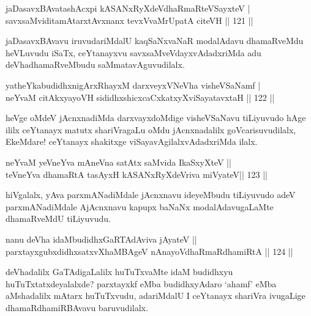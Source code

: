 \begin{shl}
jaDasavxBAvatashAcxpi kASANxRyXdeVdhaRmaRteVSayxteV | \\
savxsaMviditamAtarxtAvxnanx tevxVvaMrUpatA citeVH \hfill||  121 ||  
\end{shl}

\begin{artha}
jaDasavxBAvavu iruvudariMdalU kaqSaNxvaNaR modalAdavu dhamaRveMdu heVLuvudu iSaTx, ceYtanayxvu savxsaMveVdayxvAdadxriMda adu deVhadhamaRveMbudu saMmatavAguvudilalx.
\end{artha}

\begin{shl}
yatheYkabudidhxnigArxRhayxM darxveyxVNeVha visheVSaNamf | \\
neYvaM citAkxyayoVH sididhxshicxcaCxkatxyXviSayatavxtaH \hfill||  122 ||  
\end{shl}

\begin{artha}
heVge oMdeV jAcnxnadiMda darxvayxdoMdige visheVSaNavu tiLiyuvudo hAge ililx ceYtanayx matutx shariVragaLu oMdu jAcnxnadalilx goVcarisuvudilalx, EkeMdare! ceYtanayx shakitxge viSayavAgilalxvAdadxriMda ilalx.
\end{artha}


\begin{shl}
neYvaM yeVneYva mAneVna satAtx saMvida IkaSxyXteV ||  \\
teVneYva dhamaRtA tasAyxH kASANxRyXdeVriva miVyateV\hfill ||  123 ||  
\end{shl}

\begin{artha}
hiVgalalx, yAva parxmANadiMdale jAcnxnavu ideyeMbudu tiLiyuvudo adeV parxmANadiMdale AjAcnxnavu kapupx baNaNx modalAdavugaLaMte dhamaRveMdU tiLiyuvudu.
\end{artha}


\begin{shl}
nanu deVha idaMbudidhxGaRTAdAviva jAyateV ||  \\
parxtayxgubxdidhxsatxvXhaMBAgeV nAnayoVdhaRmaRdhamiRtA \hfill ||  124 ||  
\end{shl}

\begin{artha}
deVhadalilx GaTAdigaLalilx huTuTxvaMte idaM budidhxyu huTuTxtatxdeyalalxde? parxtayxkf eMba budidhxyAdaro `ahamf' eMba aMshadalilx mAtarx huTuTxvudu, adariMdalU I ceYtanayx shariVra ivugaLige dhamaRdhamiRBAvavu baruvudilalx.
\end{artha}

